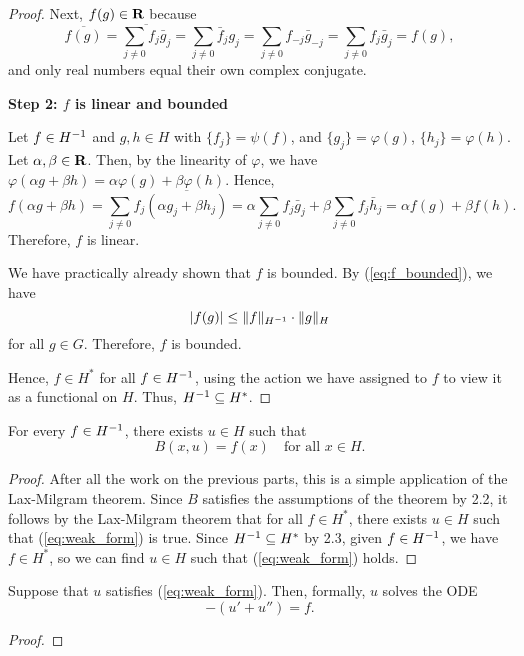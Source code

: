 \documentclass{homework}
\begin{document}
\begin{arabicparts}
\begin{proof}
			Next, $f(g) \in \textbf{R}$ because
			\begin{equation}
				\overline{f(g)}=\overline{\sum_{j\ne0}f_j\bar{g}_j} = \sum_{j\ne0}\bar{f}_jg_j = \sum_{j\ne0}f_{-j}\bar{g}_{-j} = \sum_{j\ne0}f_j\bar{g}_j = f(g),
			\end{equation}
			and only real numbers equal their own complex conjugate.
			
			\textbf{Step 2: $f$ is linear and bounded}
			
			Let $f \in {H^{-1}}$ and $g,h \in H$ with $\{f_j\} = \psi(f)$, and $\{g_j\} = \varphi(g)$, $\{h_j\} = \varphi(h)$. Let $\alpha,\beta\in\textbf{R}$. Then, by the linearity of $\varphi$, we have $\varphi(\alpha g + \beta h) = \alpha\varphi(g) + \beta\varphi(h)$. Hence,
			\begin{equation}
				f(\alpha g + \beta h) = \sum_{j\ne0} f_j\overline{(\alpha g_j + \beta h_j)} = \alpha\sum_{j\ne0}f_j\bar{g}_j + \beta\sum_{j\ne0}f_j\bar{h}_j = \alpha f(g) + \beta f(h).
			\end{equation}
			Therefore, $f$ is linear.
			
			We have practically already shown that $f$ is bounded. By (\ref{eq:f_bounded}), we have
			\begin{equation}
				|f(g)| \le \lVert f\rVert_{H^{-1}}\cdot\lVert g\rVert_H
			\end{equation}
			for all $g \in G$. Therefore, $f$ is bounded.
			
			Hence, $f \in H^*$ for all $f \in {H^{-1}}$, using the action we have assigned to $f$ to view it as a functional on $H$. Thus, ${H^{-1}} \subseteq H^*$.
		\end{proof}
		
		\questionpart
		For every $f \in {H^{-1}}$, there exists $u \in H$ such that
		\begin{equation}
			\label{eq:weak_form}
			B(x,u) = f(x) \quad\text{for all } x\in H.
		\end{equation}
		
		\begin{proof}
			After all the work on the previous parts, this is a simple application of the Lax-Milgram theorem. Since $B$ satisfies the assumptions of the theorem by 2.2, it follows by the Lax-Milgram theorem that for all $f \in H^*$, there exists $u \in H$ such that (\ref{eq:weak_form}) is true. Since ${H^{-1}} \subseteq H^*$ by 2.3, given $f \in {H^{-1}}$, we have $f \in H^*$, so we can find $u\in H$ such that (\ref{eq:weak_form}) holds.
		\end{proof}
		
		\questionpart
		Suppose that $u$ satisfies (\ref{eq:weak_form}). Then, formally, $u$ solves the ODE
		\begin{equation}
			-(u' + u'')= f.
		\end{equation}
		\begin{proof}
			

\end{proof}
\end{arabicparts}
\end{document}
